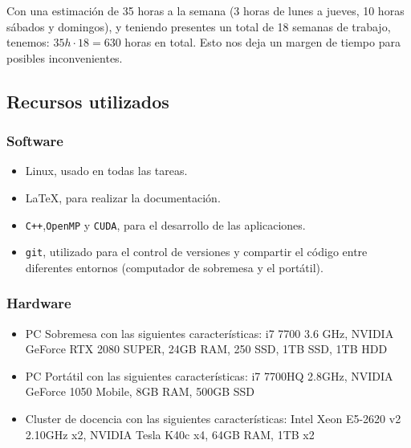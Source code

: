 \documentclass[titlepage,12pt]{report}
\begin{document}
Con una estimación de 35 horas a la semana (3 horas de lunes a jueves, 10 horas sábados y domingos), y teniendo presentes un total de 18 semanas de trabajo, tenemos: $35h \cdot 18 = 630$ horas en total. Esto nos deja un margen de tiempo para posibles inconvenientes.

\subsection{Recursos utilizados}

\subsubsection{Software}

\begin{itemize}
	\item Linux, usado en todas las tareas.
	\item \LaTeX , para realizar la documentación.
	\item \texttt{C++},\texttt{OpenMP} y \texttt{CUDA}, para el desarrollo de las aplicaciones.
	\item \texttt{git}, utilizado para el control de versiones y compartir el código entre diferentes entornos (computador de sobremesa y el portátil).
\end{itemize}

\subsubsection{Hardware}

\begin{itemize}
	\item PC Sobremesa con las siguientes características: i7 7700 3.6 GHz, NVIDIA GeForce RTX 2080 SUPER, 24GB RAM, 250 SSD, 1TB SSD, 1TB HDD
	\item PC Portátil con las siguientes características: i7 7700HQ 2.8GHz, NVIDIA GeForce 1050 Mobile, 8GB RAM, 500GB SSD
	\item Cluster de docencia con las siguientes características: Intel Xeon E5-2620 v2 2.10GHz x2, NVIDIA Tesla K40c x4, 64GB RAM, 1TB x2
\end{itemize}
\end{document}
